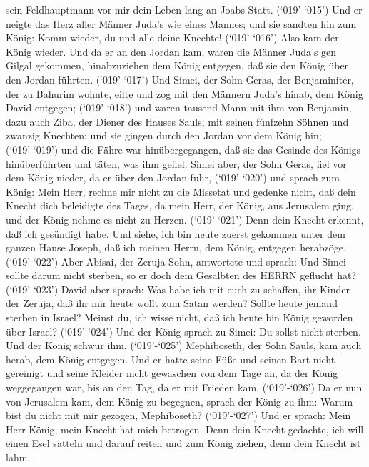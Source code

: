 sein Feldhauptmann vor mir dein Leben lang an Joabs Statt. 
(`019'-`015') Und er neigte das Herz aller Männer Juda's wie eines
Mannes; und sie sandten hin zum König: Komm wieder, du und alle deine
Knechte!  (`019'-`016') Also kam der König wieder. Und da
er an den Jordan kam, waren die Männer Juda's gen Gilgal gekommen,
hinabzuziehen dem König entgegen, daß sie den König über den Jordan
führten.  (`019'-`017') Und Simei, der Sohn Geras, der
Benjaminiter, der zu Bahurim wohnte, eilte und zog mit den Männern
Juda's hinab, dem König David entgegen;  (`019'-`018') und
waren tausend Mann mit ihm von Benjamin, dazu auch Ziba, der Diener des
Hauses Sauls, mit seinen fünfzehn Söhnen und zwanzig Knechten; und sie
gingen durch den Jordan vor dem König hin;  (`019'-`019')
und die Fähre war hinübergegangen, daß sie das Gesinde des Königs
hinüberführten und täten, was ihm gefiel. Simei aber, der Sohn Geras,
fiel vor dem König nieder, da er über den Jordan fuhr, 
(`019'-`020') und sprach zum König: Mein Herr, rechne mir nicht zu die
Missetat und gedenke nicht, daß dein Knecht dich beleidigte des Tages,
da mein Herr, der König, aus Jerusalem ging, und der König nehme es
nicht zu Herzen.  (`019'-`021') Denn dein Knecht erkennt,
daß ich gesündigt habe. Und siehe, ich bin heute zuerst gekommen unter
dem ganzen Hause Joseph, daß ich meinen Herrn, dem König, entgegen
herabzöge.  (`019'-`022') Aber Abisai, der Zeruja Sohn,
antwortete und sprach: Und Simei sollte darum nicht sterben, so er doch
dem Gesalbten des HERRN geflucht hat?  (`019'-`023') David
aber sprach: Was habe ich mit euch zu schaffen, ihr Kinder der Zeruja,
daß ihr mir heute wollt zum Satan werden? Sollte heute jemand sterben in
Israel? Meinst du, ich wisse nicht, daß ich heute bin König geworden
über Israel?  (`019'-`024') Und der König sprach zu Simei:
Du sollst nicht sterben. Und der König schwur ihm. 
(`019'-`025') Mephiboseth, der Sohn Sauls, kam auch herab, dem König
entgegen. Und er hatte seine Füße und seinen Bart nicht gereinigt und
seine Kleider nicht gewaschen von dem Tage an, da der König weggegangen
war, bis an den Tag, da er mit Frieden kam.  (`019'-`026')
Da er nun von Jerusalem kam, dem König zu begegnen, sprach der König zu
ihm: Warum bist du nicht mit mir gezogen, Mephiboseth? 
(`019'-`027') Und er sprach: Mein Herr König, mein Knecht hat mich
betrogen. Denn dein Knecht gedachte, ich will einen Esel satteln und
darauf reiten und zum König ziehen, denn dein Knecht ist lahm.
